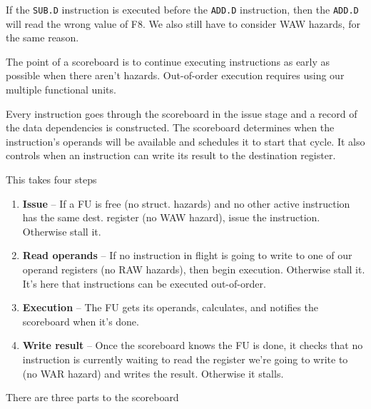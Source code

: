 \documentclass{article}
\begin{document}
If the \texttt{SUB.D} instruction is executed before the \texttt{ADD.D} instruction, then the \texttt{ADD.D} will read the wrong value of F8. We also still have to consider WAW hazards, for the same reason.

The point of a scoreboard is to continue executing instructions as early as possible when there aren't hazards. Out-of-order execution requires using our multiple functional units. 

Every instruction goes through the scoreboard in the issue stage and a record of the data dependencies is constructed. The scoreboard determines when the instruction's operands will be available and schedules it to start that cycle. It also controls when an instruction can write its result to the destination register. 

This takes four steps

\begin{enumerate}
\item \textbf{Issue} -- If a FU is free (no struct. hazards) and no other active instruction has the same dest. register (no WAW hazard), issue the instruction. Otherwise stall it.

\item \textbf{Read operands} -- If no instruction in flight is going to write to one of our operand registers (no RAW hazards), then begin execution. Otherwise stall it. It's here that instructions can be executed out-of-order.

\item \textbf{Execution} -- The FU gets its operands, calculates, and notifies the scoreboard when it's done.

\item \textbf{Write result} -- Once the scoreboard knows the FU is done, it checks that no instruction is currently waiting to read the register we're going to write to (no WAR hazard) and writes the result. Otherwise it stalls.

\end{enumerate}

There are three parts to the scoreboard
\end{document}

